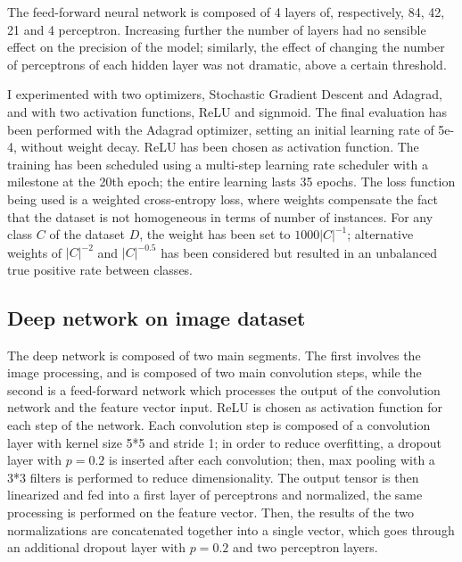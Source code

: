 \documentclass[10pt,a4paper]{article}
\begin{document}
The feed-forward neural network is composed of 4 layers of, respectively, 84, 42, 21 and 4 perceptron.
Increasing further the number of layers had no sensible effect on the precision of the model; similarly, the effect of changing the number of perceptrons of each hidden layer was not dramatic, above a certain threshold.

I experimented with two optimizers, Stochastic Gradient Descent and Adagrad, and with two activation functions, ReLU and signmoid. The final evaluation has been performed with the Adagrad optimizer, setting an initial learning rate of 5e-4, without weight decay. ReLU has been chosen as activation function. The training has been scheduled using a multi-step learning rate scheduler with a milestone at the 20th epoch; the entire learning lasts 35 epochs. The loss function being used is a weighted cross-entropy loss, where weights compensate the fact that the dataset is not homogeneous in terms of number of instances. For any class $C$ of the dataset $D$, the weight has been set to $1000{|C|}^{-1}$; alternative weights of ${|C|}^{-2}$ and $|C|^{-0.5}$ has been considered but resulted in an unbalanced true positive rate between classes.


\subsection{Deep network on image dataset}

The deep network is composed of two main segments. The first involves the image processing, and is composed of two main convolution steps, while the second is a feed-forward network which processes the output of the convolution network and the feature vector input. ReLU is chosen as activation function for each step of the network.
Each convolution step is composed of a convolution layer with kernel size 5*5 and stride 1; in order to reduce overfitting, a dropout layer with $p = 0.2$ is inserted after each convolution; then, max pooling with a 3*3 filters is performed to reduce dimensionality.
The output tensor is then linearized and fed into a first layer of perceptrons and normalized, the same processing is performed on the feature vector. Then, the results of the two normalizations are concatenated together into a single vector, which goes through an additional dropout layer with $p = 0.2$ and two perceptron layers.  
\end{document}
